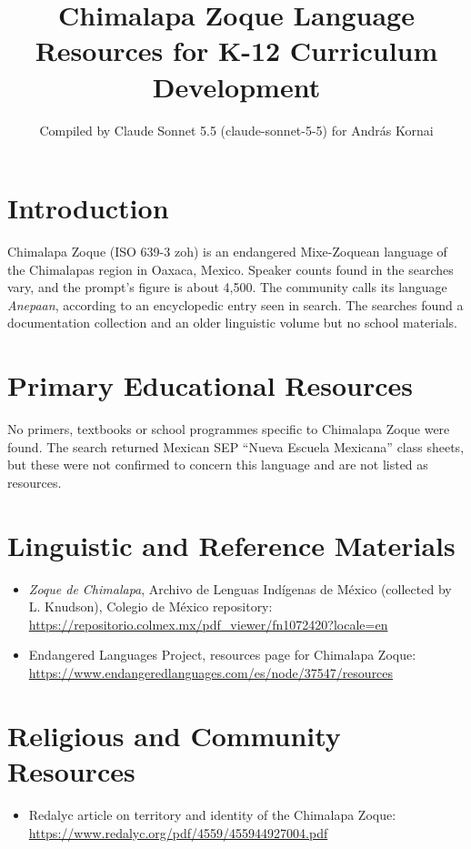 \documentclass[12pt]{article}
\title{Chimalapa Zoque Language Resources for K-12 Curriculum Development}
\author{Compiled by Claude Sonnet 5.5 (claude-sonnet-5-5) for Andr\'as Kornai}
\date{}
\begin{document}
\maketitle

\section{Introduction}
Chimalapa Zoque (ISO 639-3 zoh) is an endangered Mixe-Zoquean language of the Chimalapas region in Oaxaca, Mexico. Speaker counts found in the searches vary, and the prompt's figure is about 4,500. The community calls its language \emph{Anepaan}, according to an encyclopedic entry seen in search. The searches found a documentation collection and an older linguistic volume but no school materials.

\section{Primary Educational Resources}
No primers, textbooks or school programmes specific to Chimalapa Zoque were found. The search returned Mexican SEP ``Nueva Escuela Mexicana'' class sheets, but these were not confirmed to concern this language and are not listed as resources.

\section{Linguistic and Reference Materials}
\begin{itemize}
\item \emph{Zoque de Chimalapa}, Archivo de Lenguas Ind\'igenas de M\'exico (collected by L. Knudson), Colegio de M\'exico repository: \url{https://repositorio.colmex.mx/pdf_viewer/fn1072420?locale=en}
\item Endangered Languages Project, resources page for Chimalapa Zoque: \url{https://www.endangeredlanguages.com/es/node/37547/resources}
\end{itemize}

\section{Religious and Community Resources}
\begin{itemize}
\item Redalyc article on territory and identity of the Chimalapa Zoque: \url{https://www.redalyc.org/pdf/4559/455944927004.pdf}
\end{itemize}
\end{document}
